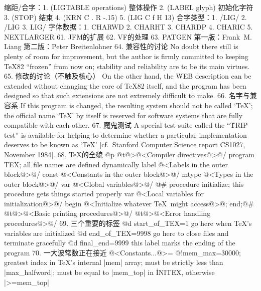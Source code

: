     缩距/合字：1. (LIGTABLE operations) 整体操作
               2. (LABEL glyph) 初始化字符
               3. (STOP) 结束
               4. (KRN C . R -.15)
               5. (LIG C f H 13)
    合字类型：1. /LIG/
              2. /LIG
              3. LIG/
    字体数据：1. CHARWD
              2. CHARHT
              3. CHARDP
              4. CHARIC
              5. NEXTLARGER
61. JFM的扩展
62. VF的处理
63. PATGEN
    第一版：Frank~M. Liang
    第二版：Peter Breitenlohner
64. 兼容性的讨论
    No doubt there still is plenty of room for improvement, but the author
    is firmly committed to keeping \TeX82 ``frozen'' from now on; stability
    and reliability are to be its main virtues.
65. 修改的讨论（不触及核心）
    On the other hand, the \.{WEB} description can be extended without changing
    the core of \TeX82 itself, and the program has been designed so that such
    extensions are not extremely difficult to make.
66. 名字与兼容系
    If this program is changed, the resulting system should not be called
    `\TeX'; the official name `\TeX' by itself is reserved
    for software systems that are fully compatible with each other.
67. 魔鬼测试
    A special test suite called the ``\.{TRIP} test'' is available for
    helping to determine whether a particular implementation deserves to be
    known as `\TeX' [cf.~Stanford Computer Science report CS1027,
    November 1984].
68. TeX的全貌
    @p @t\4@>@<Compiler directives@>@/
    program TEX; {all file names are defined dynamically}
    label @<Labels in the outer block@>@/
    const @<Constants in the outer block@>@/
    mtype @<Types in the outer block@>@/
    var @<Global variables@>@/
    @#
    procedure initialize; {this procedure gets things started properly}
      var @<Local variables for initialization@>@/
      begin @<Initialize whatever \TeX\ might access@>@;
      end;@#
    @t\4@>@<Basic printing procedures@>@/
    @t\4@>@<Error handling procedures@>@/
69. 三个重要的标签
    @d start_of_TEX=1 {go here when \TeX's variables are initialized}
    @d end_of_TEX=9998 {go here to close files and terminate gracefully}
    @d final_end=9999 {this label marks the ending of the program}
70. 一大波常数正在接近
    @<Constants...@>=
    @!mem_max=30000; {greatest index in \TeX's internal |mem| array;
      must be strictly less than |max_halfword|;
      must be equal to |mem_top| in \.{INITEX}, otherwise |>=mem_top|}
